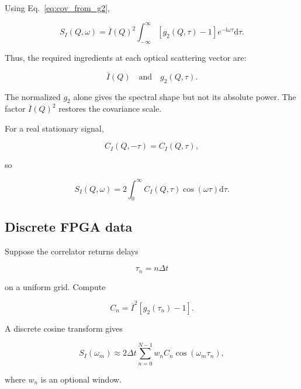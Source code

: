 \documentclass[11pt]{article}
\renewcommand{\dd}{\mathrm{d}}
\newcommand{\ii}{\mathrm{i}}
\begin{document}
Using Eq.~\eqref{eq:cov_from_g2},

\begin{equation}
\boxed{
    S_I(Q,\omega)
    =
    \overline{I}(Q)^2
    \int_{-\infty}^{\infty}
    \left[
        g_2(Q,\tau)-1
    \right]
    e^{-\ii\omega\tau}
    \dd\tau.
}
\label{eq:Sfromg2}
\end{equation}

Thus, the required ingredients at each optical scattering vector are:

\begin{equation}
    \overline{I}(Q)
    \quad\text{and}\quad
    g_2(Q,\tau).
\end{equation}

The normalized $g_2$ alone gives the spectral shape but not its absolute
power. The factor $\overline{I}(Q)^2$ restores the covariance scale.

For a real stationary signal,

\begin{equation}
    C_I(Q,-\tau)=C_I(Q,\tau),
\end{equation}

so

\begin{equation}
    S_I(Q,\omega)
    =
    2
    \int_0^\infty
    C_I(Q,\tau)
    \cos(\omega\tau)
    \dd\tau.
\end{equation}

\subsection{Discrete FPGA data}

Suppose the correlator returns delays

\begin{equation}
    \tau_n=n\Delta t
\end{equation}

on a uniform grid. Compute

\begin{equation}
    C_n
    =
    \overline{I}^2
    \left[
        g_2(\tau_n)-1
    \right].
\end{equation}

A discrete cosine transform gives

\begin{equation}
    S_I(\omega_m)
    \approx
    2\Delta t
    \sum_{n=0}^{N-1}
    w_n C_n
    \cos(\omega_m\tau_n),
\end{equation}

where $w_n$ is an optional window.
\end{document}
